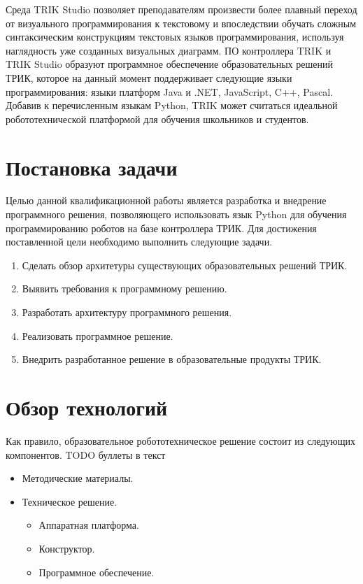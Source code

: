 \documentclass[14pt]{matmex-diploma-custom}
\begin{document}
Среда TRIK Studio позволяет преподавателям произвести более плавный переход от визуального программирования к текстовому и впоследствии обучать сложным синтаксическим конструкциям текстовых языков программирования, используя наглядность уже созданных визуальных диаграмм. ПО контроллера TRIK и TRIK Studio образуют программное обеспечение образовательных решений ТРИК, которое на данный момент поддерживает следующие языки программирования: языки платформ Java и .NET, JavaScript, C++, Pascal. Добавив к перечисленным языкам Python, TRIK может считаться идеальной робототехнической платформой для обучения школьников и студентов.


\section*{Постановка задачи}

Целью данной квалификационной работы является разработка и внедрение программного решения, позволяющего использовать язык Python для обучения программированию роботов на базе контроллера ТРИК. Для достижения поставленной цели необходимо выполнить следующие задачи.

\begin{enumerate}
\item Сделать обзор архитетуры существующих образовательных решений ТРИК.
\item Выявить требования к программному решению.
\item Разработать архитектуру программного решения.
\item Реализовать программное решение.
\item Внедрить разработанное решение в образовательные продукты ТРИК.
\end{enumerate}

\section{Обзор технологий}

Как правило, образовательное робототехническое решение состоит из следующих компонентов. TODO буллеты в текст
\begin{itemize}
    \item Методические материалы.
    \item Техническое решение.
        \begin{itemize}
            \item Аппаратная платформа.
            \item Конструктор.
            \item Программное обеспечение.
        \end{itemize}
\end{itemize}
\end{document}
